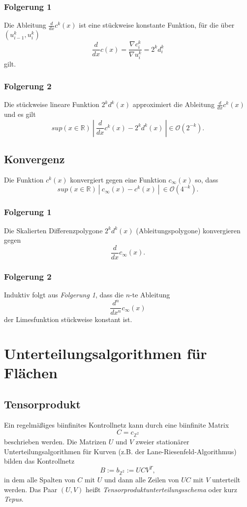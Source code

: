 \subsubsection{Folgerung 1}
Die Ableitung \(\frac{d}{dx}c^k(x)\) ist eine stückweise konstante Funktion, für die über \((u_{i-1}^k, u_i^k)\)
\[\frac{d}{dx}c(x) = \frac{\nabla c_i^k}{\nabla u_i^k} = 2^k d_i^k\]
gilt.

\subsubsection{Folgerung 2}
Die stückweise lineare Funktion \(2^k d^k(x)\) approximiert die Ableitung \(\frac{d}{dx} c^k(x)\) und es gilt
\[sup(x \in \mathbb{R})~|~\frac{d}{dx} c^k(x) - 2^k d^k(x)~| \in \mathcal{O}(2^{-k}).\]


\subsection{Konvergenz}
Die Funktion \(c^k(x)\) konvergiert gegen eine Funktion \(c_{\infty}(x)\) so, dass
\[sup(x \in \mathbb{R})~|~c_{\infty}(x) - c^k(x)~|~\in \mathcal{O}(4^{-k}).\]

\subsubsection{Folgerung 1}
Die Skalierten Differenzpolygone \(2^k d^k(x)\) (Ableitungspolygone) konvergieren gegen
\[\frac{d}{dx} c_{\infty}(x).\]

\subsubsection{Folgerung 2}
Induktiv folgt aus \textit{Folgerung 1}, dass die \(n\)-te Ableitung
\[\frac{d^n}{dx^n} c_{\infty}(x)\]
der Limesfunktion stückweise konstant ist.



\section{Unterteilungsalgorithmen für Flächen}

\subsection{Tensorprodukt}
Ein regelmäßiges biinfinites Kontrollnetz kann durch eine biinfinite Matrix
\[C = c_{\mathbb{Z}^2}\]
beschrieben werden. Die Matrizen \(U\) und \(V\) zweier stationärer Unterteilungsalgorithmen für Kurven (z.B. der Lane-Riesenfeld-Algorithmus) bilden das Kontrollnetz
\[B := b_{\mathbb{Z}^2} := UCV^T,\]
in dem alle Spalten von \(C\) mit \(U\) und dann alle Zeilen von \(UC\) mit \(V\) unterteilt werden. Das Paar \((U,V)\) heißt \textit{Tensorproduktunterteilungsschema} oder kurz \textit{Tepus}.

